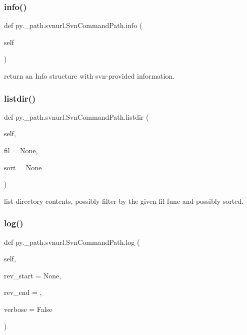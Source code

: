 \subsubsection{\texorpdfstring{info()}{info()}}
{\footnotesize\ttfamily def py.\+\_\+path.\+svnurl.\+Svn\+Command\+Path.\+info (\begin{DoxyParamCaption}\item[{}]{self }\end{DoxyParamCaption})}

\begin{DoxyVerb}return an Info structure with svn-provided information. \end{DoxyVerb}
 \mbox{\label{classpy_1_1__path_1_1svnurl_1_1_svn_command_path_a3b00a0a86e5fa7d7dea985c810673ff7}} 
\subsubsection{\texorpdfstring{listdir()}{listdir()}}
{\footnotesize\ttfamily def py.\+\_\+path.\+svnurl.\+Svn\+Command\+Path.\+listdir (\begin{DoxyParamCaption}\item[{}]{self,  }\item[{}]{fil = {\ttfamily None},  }\item[{}]{sort = {\ttfamily None} }\end{DoxyParamCaption})}

\begin{DoxyVerb}list directory contents, possibly filter by the given fil func
    and possibly sorted.
\end{DoxyVerb}
 \mbox{\label{classpy_1_1__path_1_1svnurl_1_1_svn_command_path_a0552e3647238a74f351ea7d7f04f06e5}} 
\subsubsection{\texorpdfstring{log()}{log()}}
{\footnotesize\ttfamily def py.\+\_\+path.\+svnurl.\+Svn\+Command\+Path.\+log (\begin{DoxyParamCaption}\item[{}]{self,  }\item[{}]{rev\+\_\+start = {\ttfamily None},  }\item[{}]{rev\+\_\+end = {},  }\item[{}]{verbose = {\ttfamily False} }\end{DoxyParamCaption})}

